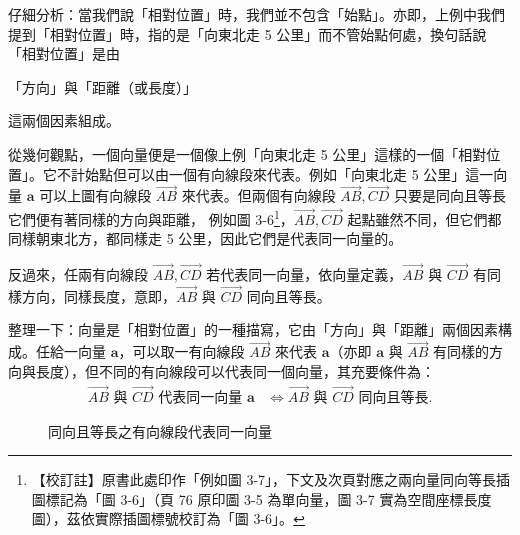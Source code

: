 仔細分析：當我們說「相對位置」時，我們並不包含「始點」。亦即，上例中我們提到「相對位置」時，指的是「向東北走 5 公里」而不管始點何處，換句話說「相對位置」是由
\begin{center}
「方向」與「距離（或長度）」
\end{center}
這兩個因素組成。

從幾何觀點，一個向量便是一個像上例「向東北走 5 公里」這樣的一個「相對位置」。它不計始點但可以由一個有向線段來代表。例如「向東北走 5 公里」這一向量 $\mathbf{a}$ 可以上圖有向線段 $\vec{AB}$ 來代表。但兩個有向線段 $\vec{AB}, \vec{CD}$ 只要是同向且等長它們便有著同樣的方向與距離，\label{note:b3s-ch3-p76-fig-ref}%
例如圖 3-6\footnote{【校訂註】原書此處印作「例如圖 3-7」，下文及次頁對應之兩向量同向等長插圖標記為「圖 3-6」（頁 76 原印圖 3-5 為單向量，圖 3-7 實為空間座標長度圖），茲依實際插圖標號校訂為「圖 3-6」。}，$\vec{AB}, \vec{CD}$ 起點雖然不同，但它們都同樣朝東北方，都同樣走 5 公里，因此它們是代表同一向量的。

反過來，任兩有向線段 $\vec{AB}, \vec{CD}$ 若代表同一向量，依向量定義，$\vec{AB}$ 與 $\vec{CD}$ 有同樣方向，同樣長度，意即，$\vec{AB}$ 與 $\vec{CD}$ 同向且等長。

整理一下：向量是「相對位置」的一種描寫，它由「方向」與「距離」兩個因素構成。任給一向量 $\mathbf{a}$，可以取一有向線段 $\vec{AB}$ 來代表 $\mathbf{a}$（亦即 $\mathbf{a}$ 與 $\vec{AB}$ 有同樣的方向與長度），但不同的有向線段可以代表同一個向量，其充要條件為：
\begin{align*}
\vec{AB} \text{ 與 } \vec{CD} \text{ 代表同一向量 } \mathbf{a} &\iff \vec{AB} \text{ 與 } \vec{CD} \text{ 同向且等長}.
\end{align*}

\begin{figure}[H]
\centering
{}
\caption{同向且等長之有向線段代表同一向量}
\label{fig:b3s-fig3-6}
\end{figure}

